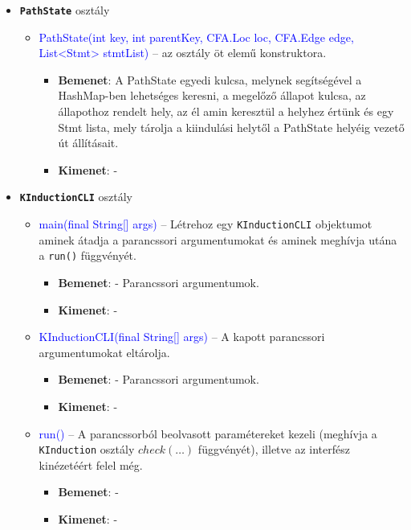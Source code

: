 \begin{itemize}
	\item \textbf{\texttt{PathState}} osztály
	\begin{itemize}
		\item \textcolor{blue}{PathState(int key, int parentKey, CFA.Loc loc, CFA.Edge edge, List<Stmt> stmtList)} -- az osztály öt elemű konstruktora.
		\begin{itemize}
			\item \textbf{Bemenet}: A PathState egyedi kulcsa, melynek segítségével a HashMap-ben lehetséges keresni, a megelőző állapot kulcsa, az állapothoz rendelt hely, az él amin keresztül a helyhez értünk és egy Stmt lista, mely tárolja a kiindulási helytől a PathState helyéig vezető út állításait. 
			\item \textbf{Kimenet}: -
		\end{itemize}
	\end{itemize}

	\item \textbf{\texttt{KInductionCLI}} osztály
	\begin{itemize}
		\item \textcolor{blue}{main(final String[] args)} -- Létrehoz egy \texttt{KInductionCLI} objektumot aminek átadja a parancssori argumentumokat és aminek meghívja utána a \texttt{run()} függvényét.
		\begin{itemize}
			\item \textbf{Bemenet}: - Parancssori argumentumok.
			\item \textbf{Kimenet}: -
		\end{itemize}
		
		\item \textcolor{blue}{KInductionCLI(final String[] args)} -- A kapott parancssori argumentumokat eltárolja.
		\begin{itemize}
			\item \textbf{Bemenet}: - Parancssori argumentumok.
			\item \textbf{Kimenet}: -
		\end{itemize}
		
		\item \textcolor{blue}{run()} -- A parancssorból beolvasott paramétereket kezeli (meghívja a \texttt{KInduction} osztály \texttt{$ check(\ldots) $} függvényét), illetve az interfész kinézetéért felel még.
		\begin{itemize}
			\item \textbf{Bemenet}: -
			\item \textbf{Kimenet}: -
		\end{itemize}
	\end{itemize}


\end{itemize}
